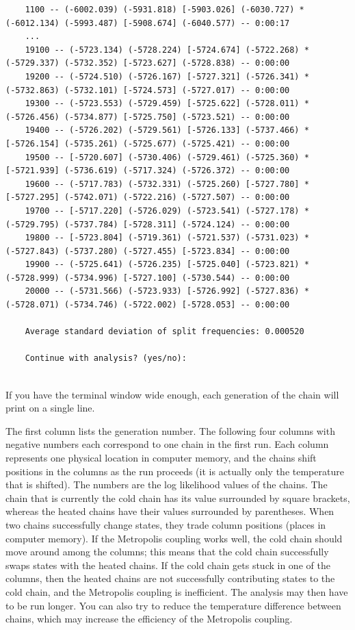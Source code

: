 \documentclass[12pt]{book}
\begin{document}
\begin{singlespacing}
\begin{verbatim}
    1100 -- (-6002.039) (-5931.818) [-5903.026] (-6030.727) * (-6012.134) (-5993.487) [-5908.674] (-6040.577) -- 0:00:17
    ...
    19100 -- (-5723.134) (-5728.224) [-5724.674] (-5722.268) * (-5729.337) (-5732.352) [-5723.627] (-5728.838) -- 0:00:00
    19200 -- (-5724.510) (-5726.167) [-5727.321] (-5726.341) * (-5732.863) (-5732.101) [-5724.573] (-5727.017) -- 0:00:00
    19300 -- (-5723.553) (-5729.459) [-5725.622] (-5728.011) * (-5726.456) (-5734.877) [-5725.750] (-5723.521) -- 0:00:00
    19400 -- (-5726.202) (-5729.561) [-5726.133] (-5737.466) * [-5726.154] (-5735.261) (-5725.677) (-5725.421) -- 0:00:00
    19500 -- [-5720.607] (-5730.406) (-5729.461) (-5725.360) * [-5721.939] (-5736.619) (-5717.324) (-5726.372) -- 0:00:00
    19600 -- (-5717.783) (-5732.331) (-5725.260) [-5727.780] * [-5727.295] (-5742.071) (-5722.216) (-5727.507) -- 0:00:00
    19700 -- [-5717.220] (-5726.029) (-5723.541) (-5727.178) * (-5729.795) (-5737.784) [-5728.311] (-5724.124) -- 0:00:00
    19800 -- [-5723.804] (-5719.361) (-5721.537) (-5731.023) * (-5727.843) (-5737.280) (-5727.455) [-5723.834] -- 0:00:00
    19900 -- (-5725.641) (-5726.235) [-5725.040] (-5723.821) * (-5728.999) (-5734.996) [-5727.100] (-5730.544) -- 0:00:00
    20000 -- (-5731.566) (-5723.933) [-5726.992] (-5727.836) * (-5728.071) (-5734.746) (-5722.002) [-5728.053] -- 0:00:00
 
    Average standard deviation of split frequencies: 0.000520
 
    Continue with analysis? (yes/no): 
  
\end{verbatim}
\normalsize
\end{singlespacing}

If you have the terminal window wide enough, each generation of the chain will print on a single
line.

The first column lists the generation number. The following four columns with negative numbers each
correspond to one chain in the first run. Each column represents one physical location in computer
memory, and the chains shift positions in the columns as the run proceeds (it is actually only the
temperature that is shifted). The numbers are the log likelihood values of the chains. The chain
that is currently the cold chain has its value surrounded by square brackets, whereas the heated
chains have their values surrounded by parentheses. When two chains successfully change states,
they trade column positions (places in computer memory). If the Metropolis coupling works well, the
cold chain should move around among the columns; this means that the cold chain successfully swaps
states with the heated chains. If the cold chain gets stuck in one of the columns, then the heated
chains are not successfully contributing states to the cold chain, and the Metropolis coupling is
inefficient. The analysis may then have to be run longer. You can also try to reduce the
temperature difference between chains, which may increase the efficiency of the Metropolis
coupling.
\end{document}
